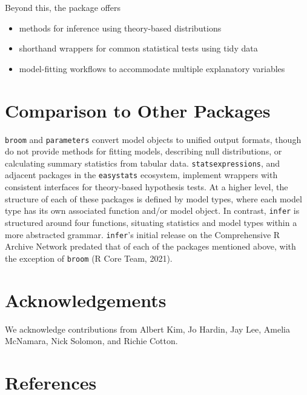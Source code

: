 \documentclass[10pt,a4paper,onecolumn]{article}
\providecommand{\tightlist}{%
  \setlength{\itemsep}{0pt}\setlength{\parskip}{0pt}}
\begin{document}
Beyond this, the package offers

\begin{itemize}
\tightlist
\item
  methods for inference using theory-based distributions
\item
  shorthand wrappers for common statistical tests using tidy data
\item
  model-fitting workflows to accommodate multiple explanatory variables
\end{itemize}

\hypertarget{comparison-to-other-packages}{%
\section{Comparison to Other
Packages}\label{comparison-to-other-packages}}

\texttt{broom} and \texttt{parameters} convert model objects to unified
output formats, though do not provide methods for fitting models,
describing null distributions, or calculating summary statistics from
tabular data. \texttt{statsexpressions}, and adjacent packages in the
\texttt{easystats} ecosystem, implement wrappers with consistent
interfaces for theory-based hypothesis tests. At a higher level, the
structure of each of these packages is defined by model types, where
each model type has its own associated function and/or model object. In
contrast, \texttt{infer} is structured around four functions, situating
statistics and model types within a more abstracted grammar.
\texttt{infer}'s initial release on the Comprehensive R Archive Network
predated that of each of the packages mentioned above, with the
exception of \texttt{broom} (R Core Team, 2021).

\hypertarget{acknowledgements}{%
\section{Acknowledgements}\label{acknowledgements}}

We acknowledge contributions from Albert Kim, Jo Hardin, Jay Lee, Amelia
McNamara, Nick Solomon, and Richie Cotton.

\hypertarget{references}{%
\section*{References}\label{references}}
\end{document}
